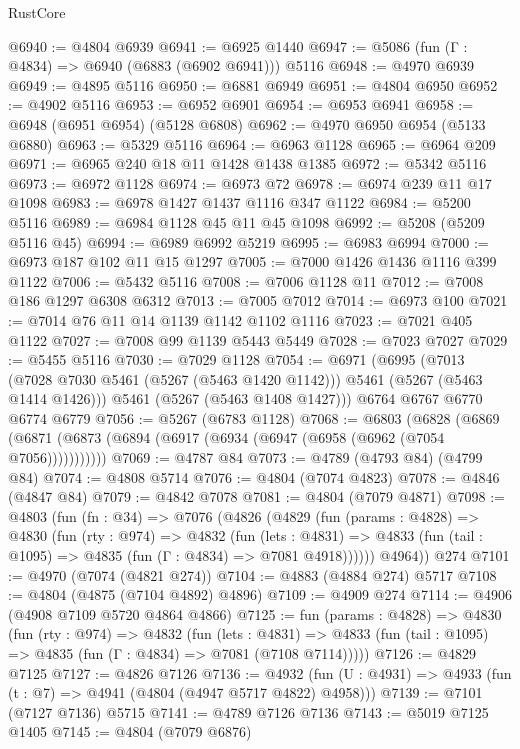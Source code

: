 \begin{lexlean}{RustCore}
\begin{coremodule}
@6940 := @4804 @6939
@6941 := @6925 @1440
@6947 := @5086 (fun (Γ : @4834) => @6940 (@6883 (@6902 @6941))) @5116
@6948 := @4970 @6939
@6949 := @4895 @5116
@6950 := @6881 @6949
@6951 := @4804 @6950
@6952 := @4902 @5116
@6953 := @6952 @6901
@6954 := @6953 @6941
@6958 := @6948 (@6951 @6954) (@5128 @6808)
@6962 := @4970 @6950 @6954 (@5133 @6880)
@6963 := @5329 @5116
@6964 := @6963 @1128
@6965 := @6964 @209
@6971 := @6965 @240 @18 @11 @1428 @1438 @1385
@6972 := @5342 @5116
@6973 := @6972 @1128
@6974 := @6973 @72
@6978 := @6974 @239 @11 @17 @1098
@6983 := @6978 @1427 @1437 @1116 @347 @1122
@6984 := @5200 @5116
@6989 := @6984 @1128 @45 @11 @45 @1098
@6992 := @5208 (@5209 @5116 @45)
@6994 := @6989 @6992 @5219
@6995 := @6983 @6994
@7000 := @6973 @187 @102 @11 @15 @1297
@7005 := @7000 @1426 @1436 @1116 @399 @1122
@7006 := @5432 @5116
@7008 := @7006 @1128 @11
@7012 := @7008 @186 @1297 @6308 @6312
@7013 := @7005 @7012
@7014 := @6973 @100
@7021 := @7014 @76 @11 @14 @1139 @1142 @1102 @1116
@7023 := @7021 @405 @1122
@7027 := @7008 @99 @1139 @5443 @5449
@7028 := @7023 @7027
@7029 := @5455 @5116
@7030 := @7029 @1128
@7054 := @6971
    (@6995
      (@7013 (@7028 @7030 @5461 (@5267 (@5463 @1420 @1142))) @5461 (@5267 (@5463 @1414 @1426)))
      @5461
      (@5267 (@5463 @1408 @1427)))
    @6764
    @6767
    @6770
    @6774
    @6779
@7056 := @5267 (@6783 @1128)
@7068 := @6803
    (@6828 (@6869 (@6871 (@6873 (@6894 (@6917 (@6934 (@6947 (@6958 (@6962 (@7054 @7056)))))))))))
@7069 := @4787 @84
@7073 := @4789 (@4793 @84) (@4799 @84)
@7074 := @4808 @5714
@7076 := @4804 (@7074 @4823)
@7078 := @4846 (@4847 @84)
@7079 := @4842 @7078
@7081 := @4804 (@7079 @4871)
@7098 := @4803
    (fun (fn : @34) =>
    @7076
      (@4826
        (@4829
          (fun (params : @4828) =>
          @4830
            (fun (rty : @974) =>
            @4832
              (fun (lets : @4831) =>
              @4833 (fun (tail : @1095) => @4835 (fun (Γ : @4834) => @7081 @4918))))))
        @4964))
    @274
@7101 := @4970 (@7074 (@4821 @274))
@7104 := @4883 (@4884 @274) @5717
@7108 := @4804 (@4875 (@7104 @4892) @4896)
@7109 := @4909 @274
@7114 := @4906 (@4908 @7109 @5720 @4864 @4866)
@7125 := fun (params : @4828) =>
  @4830
    (fun (rty : @974) =>
    @4832
      (fun (lets : @4831) =>
      @4833 (fun (tail : @1095) => @4835 (fun (Γ : @4834) => @7081 (@7108 @7114)))))
@7126 := @4829 @7125
@7127 := @4826 @7126
@7136 := @4932 (fun (U : @4931) => @4933 (fun (t : @7) => @4941 (@4804 (@4947 @5717 @4822) @4958)))
@7139 := @7101 (@7127 @7136) @5715
@7141 := @4789 @7126 @7136
@7143 := @5019 @7125 @1405
@7145 := @4804 (@7079 @6876)

\end{coremodule}
\end{lexlean}
